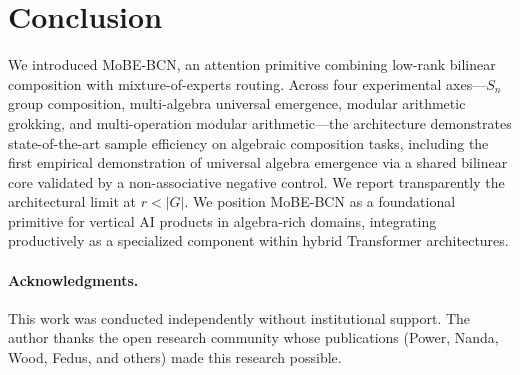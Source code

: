 \documentclass[11pt]{article}
\begin{document}
\section{Conclusion}

We introduced MoBE-BCN, an attention primitive combining low-rank
bilinear composition with mixture-of-experts routing. Across four
experimental axes---$S_n$ group composition, multi-algebra universal
emergence, modular arithmetic grokking, and multi-operation modular
arithmetic---the architecture demonstrates state-of-the-art sample
efficiency on algebraic composition tasks, including the first
empirical demonstration of universal algebra emergence via a shared
bilinear core validated by a non-associative negative control. We
report transparently the architectural limit at $r < |G|$. We position
MoBE-BCN as a foundational primitive for vertical AI products in
algebra-rich domains, integrating productively as a specialized
component within hybrid Transformer architectures.

\paragraph{Acknowledgments.}
This work was conducted independently without institutional support.
The author thanks the open research community whose publications
(Power, Nanda, Wood, Fedus, and others) made this research possible.

\small


\end{document}
